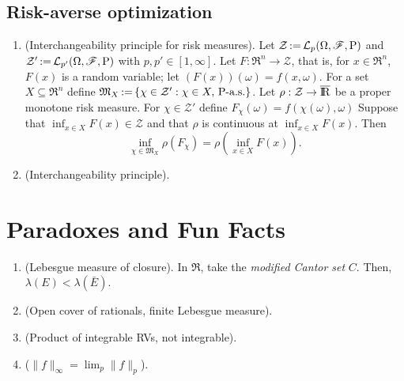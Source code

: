 \documentclass[a4paper,10pt]{article}
\begin{document}
\subsection{Risk-averse optimization}
\begin{enumerate}
 \item (Interchangeability principle for risk measures). Let $\mathcal{Z}{}\mathop{\mathrel{:}=}{} \mathcal{L}_p(\Omega,\mathscr{F},\mathrm{P})$ and 
       $\mathcal{Z}' {}\mathop{\mathrel{:}=}{} \mathcal{L}_{p'}(\Omega,\mathscr{F},\mathrm{P})$ with $p,p'\in[1,\infty]$. 
       Let $F:\Re^n\to\mathcal{Z}$, that is, for $x\in\Re^n$, $F(x)$ is a random variable; let
       $(F(x))(\omega)=f(x,\omega)$. For a set $X\subseteq \Re^n$ define 
       $\mathfrak{M}_X {}\mathop{\mathrel{:}=}{} \{\chi \in \mathcal{Z}': \chi \in X,\, \mathrm{P}\text{-a.s.}\}$.
       Let $\rho:\mathcal{Z}\to\barre$ be a proper monotone risk measure. 
       For $\chi\in\mathcal{Z}'$ define $F_\chi(\omega) = f(\chi(\omega), \omega)$
       Suppose that $\inf_{x\in X}F(x) \in \mathcal{Z}$
       and that $\rho$ is continuous at $\inf_{x\in X}F(x)$. Then
       \[
        \inf_{\chi \in \mathfrak{M}_X} \rho(F_\chi) = \rho\left(\inf_{x\in X}F(x)\right).
       \]
 \item (Interchangeability principle).
\end{enumerate}


\section{Paradoxes and Fun Facts}
\begin{enumerate}
 \item (Lebesgue measure of closure). In $\Re$, take the 
       \textit{modified Cantor set} $C$. Then, $\lambda(E)<\lambda(\bar{E})$. 
 \item (Open cover of rationals, finite Lebesgue measure).
 \item (Product of integrable RVs, not integrable).
 \item ($\|f\|_\infty = \lim_p \|f\|_p$).
\end{enumerate}
\end{document}
